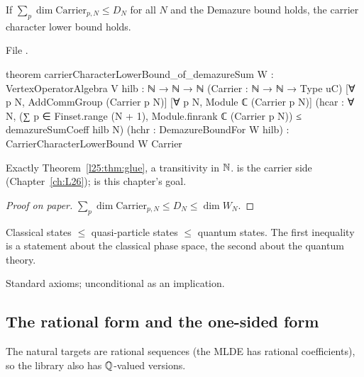 \begin{theorem}\label{l25:thm:glue}
If $\sum_p\dim\mathrm{Carrier}_{p,N}\le D_N$ for all $N$ and the Demazure bound holds, the carrier character lower
bound holds.
\end{theorem}
\noindent File .
\begin{leancode}
theorem carrierCharacterLowerBound_of_demazureSum {W : VertexOperatorAlgebra V}
    {hilb : ℕ → ℕ → ℕ}
    (Carrier : ℕ → ℕ → Type uC)
    [∀ p N, AddCommGroup (Carrier p N)] [∀ p N, Module ℂ (Carrier p N)]
    (hcar : ∀ N, (∑ p ∈ Finset.range (N + 1), Module.finrank ℂ (Carrier p N)) ≤
      demazureSumCoeff hilb N)
    (hchr : DemazureBoundFor W hilb) :
    CarrierCharacterLowerBound W Carrier
\end{leancode}
\begin{dictionary}
Exactly Theorem~\ref{l25:thm:glue}, a transitivity in ${\mathbb{N}}$.  is the carrier side
(Chapter~\ref{ch:L26});  is this chapter's goal.
\end{dictionary}
\begin{proof}[Proof on paper]
$\sum_p\dim\mathrm{Carrier}_{p,N}\le D_N\le\dim W_N$.
\end{proof}
\begin{physics}
Classical states $\le$ quasi-particle states $\le$ quantum states. The first inequality is a statement about
the classical phase space, the second about the quantum theory.
\end{physics}
\begin{status}
Standard axioms; unconditional as an implication.
\end{status}

\subsection{The rational form and the one-sided form}

The natural targets are rational sequences (the MLDE has rational coefficients), so the library also has
${\mathbb{Q}}$-valued versions.

